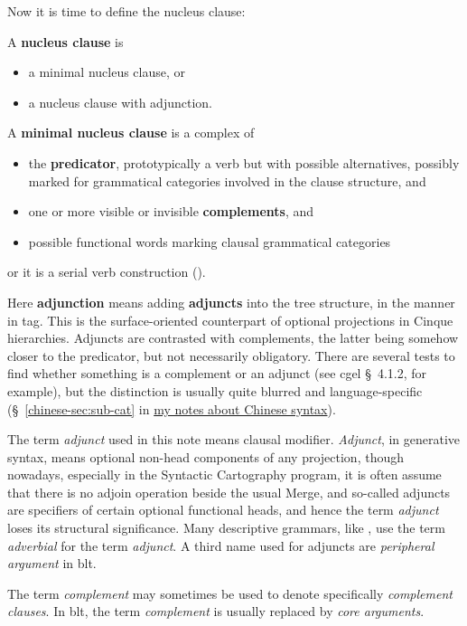 \documentclass{article}
\newcommand*{\citesec}[1]{\S~{#1}}
\newcommand*{\concept}[1]{\textbf{#1}}
\newcommand*{\term}[1]{\emph{#1}}
\newcommand{\chinese}{\href{../Chinese/main.pdf}{my notes about Chinese syntax}}
\begin{document}
Now it is time to define the nucleus clause:
\begin{exe}
    \ex\label{ex:nucleus-def} A \concept{nucleus clause} is 
    \begin{itemize}
        \item a minimal nucleus clause, or 
        \item a nucleus clause with adjunction.
    \end{itemize}
    \ex\label{ex:minimal-nucleus-def} A \concept{minimal nucleus clause} is a complex of 
    \begin{itemize}
        \item the \concept{predicator}, 
        prototypically a verb but with possible alternatives,
        possibly marked for grammatical categories involved in the clause structure, and 
        \item one or more visible or invisible \concept{complements}, and 
        \item possible functional words marking clausal grammatical categories
    \end{itemize}
    or it is a serial verb construction ().
\end{exe} 
Here \concept{adjunction} means adding \concept{adjuncts} into the tree structure, 
in the manner in \ac{tag}.
This is the surface-oriented counterpart of optional projections in Cinque hierarchies.
Adjuncts are contrasted with complements,
the latter being somehow closer to the predicator, 
but not necessarily obligatory.
There are several tests to find whether something is a complement or an adjunct
(see \ac{cgel} \citesec{4.1.2}, for example),
but the distinction is usually quite blurred and language-specific 
(\citesec{\ref{chinese-sec:sub-cat}} in \chinese).

The term \term{adjunct} used in this note means clausal modifier.
\term{Adjunct}, in generative syntax, 
means optional non-head components of any projection,
though nowadays, especially in the Syntactic Cartography program, 
it is often assume that there is no adjoin operation beside the usual Merge,
and so-called adjuncts are specifiers of certain optional functional heads,
and hence the term \term{adjunct} loses its structural significance.
Many descriptive grammars, like \citep{quirk2010comprehensive}, 
use the term \term{adverbial} for the term \term{adjunct}.
A third name used for adjuncts are \term{peripheral argument} in \ac{blt}.

The term \term{complement} may sometimes be used to denote specifically \term{complement clauses}. %
In \ac{blt}, the term \term{complement} is usually replaced by \term{core arguments}.
\end{document}
